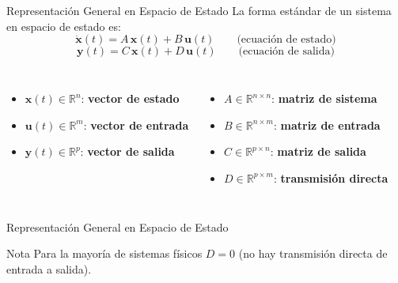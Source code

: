 \documentclass[aspectratio=169,xcolor=dvipsnames]{beamer}
\begin{document}
\begin{frame}{Representaci\'on General en Espacio de Estado}
    La forma est\'andar de un sistema en espacio de estado es:
    \begin{equation}
        \dot{\mathbf{x}}(t) = A\,\mathbf{x}(t) + B\,\mathbf{u}(t) \qquad \text{(ecuaci\'on de estado)}
    \end{equation}
    \begin{equation}
        \mathbf{y}(t) = C\,\mathbf{x}(t) + D\,\mathbf{u}(t) \qquad \text{(ecuaci\'on de salida)}
    \end{equation}
    \vspace{0.3em}
    \begin{columns}
        \begin{itemize}
            \item $\mathbf{x}(t) \in \mathbb{R}^n$: \textbf{vector de estado}
            \item $\mathbf{u}(t) \in \mathbb{R}^m$: \textbf{vector de entrada}
            \item $\mathbf{y}(t) \in \mathbb{R}^p$: \textbf{vector de salida}
        \end{itemize}
        \begin{itemize}
            \item $A \in \mathbb{R}^{n\times n}$: \textbf{matriz de sistema}
            \item $B \in \mathbb{R}^{n\times m}$: \textbf{matriz de entrada}
            \item $C \in \mathbb{R}^{p\times n}$: \textbf{matriz de salida}
            \item $D \in \mathbb{R}^{p\times m}$: \textbf{transmisi\'on directa}
        \end{itemize}
    \end{columns}
\end{frame}
\begin{frame}{Representaci\'on General en Espacio de Estado}    
    \begin{alertblock}{Nota}
        Para la mayor\'ia de sistemas f\'isicos $D = 0$ (no hay transmisi\'on directa de entrada a salida).
    \end{alertblock}
\end{frame}
\end{document}
